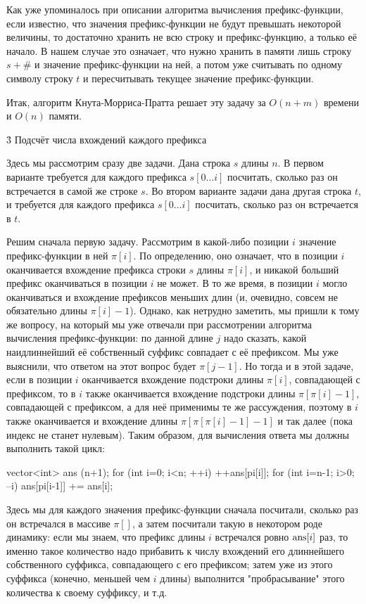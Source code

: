 Как уже упоминалось при описании алгоритма вычисления префикс-функции, если известно, что значения префикс-функции не будут превышать некоторой величины, то достаточно хранить не всю строку и префикс-функцию, а только её начало. В нашем случае это означает, что нужно хранить в памяти лишь строку $s + \#$ и значение префикс-функции на ней, а потом уже считывать по одному символу строку $t$ и пересчитывать текущее значение префикс-функции.

Итак, алгоритм Кнута-Морриса-Пратта решает эту задачу за $O(n+m)$ времени и $O(n)$ памяти.


\h3{ Подсчёт числа вхождений каждого префикса }

Здесь мы рассмотрим сразу две задачи. Дана строка $s$ длины $n$. В первом варианте требуется для каждого префикса $s[0 \ldots i]$ посчитать, сколько раз он встречается в самой же строке $s$. Во втором варианте задачи дана другая строка $t$, и требуется для каждого префикса $s[0 \ldots i]$ посчитать, сколько раз он встречается в $t$.

Решим сначала первую задачу. Рассмотрим в какой-либо позиции $i$ значение префикс-функции в ней $\pi[i]$. По определению, оно означает, что в позиции $i$ оканчивается вхождение префикса строки $s$ длины $\pi[i]$, и никакой больший префикс оканчиваться в позиции $i$ не может. В то же время, в позиции $i$ могло оканчиваться и вхождение префиксов меньших длин (и, очевидно, совсем не обязательно длины $\pi[i]-1$). Однако, как нетрудно заметить, мы пришли к тому же вопросу, на который мы уже отвечали при рассмотрении алгоритма вычисления префикс-функции: по данной длине $j$ надо сказать, какой наидлиннейший её собственный суффикс совпадает с её префиксом. Мы уже выяснили, что ответом на этот вопрос будет $\pi[j-1]$. Но тогда и в этой задаче, если в позиции $i$ оканчивается вхождение подстроки длины $\pi[i]$, совпадающей с префиксом, то в $i$ также оканчивается вхождение подстроки длины $\pi[\pi[i]-1]$, совпадающей с префиксом, а для неё применимы те же рассуждения, поэтому в $i$ также оканчивается и вхождение длины $\pi[\pi[\pi[i]-1]-1]$ и так далее (пока индекс не станет нулевым). Таким образом, для вычисления ответа мы должны выполнить такой цикл:

\code
vector<int> ans (n+1);
for (int i=0; i<n; ++i)
	++ans[pi[i]];
for (int i=n-1; i>0; --i)
	ans[pi[i-1]] += ans[i];
\endcode

Здесь мы для каждого значения префикс-функции сначала посчитали, сколько раз он встречался в массиве $\pi[]$, а затем посчитали такую в некотором роде динамику: если мы знаем, что префикс длины $i$ встречался ровно ${\rm ans}[i]$ раз, то именно такое количество надо прибавить к числу вхождений его длиннейшего собственного суффикса, совпадающего с его префиксом; затем уже из этого суффикса (конечно, меньшей чем $i$ длины) выполнится "пробрасывание" этого количества к своему суффиксу, и т.д.

